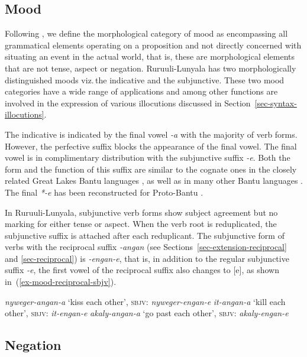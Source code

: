 \subsection{Mood}\label{sec-mood}

Following \citet[1190]{Hengeveld2004Illocution}, we define the morphological category of mood as encompassing all grammatical elements operating on a proposition and not directly concerned with situating an event in the actual world, that is, these are morphological elements that are not tense, aspect or negation. 
Ruruuli-Lunyala has two morphologically distinguished moods viz.\,the indicative and the subjunctive. 
These two  mood categories have a wide range of applications and among other functions are involved in the expression of various illocutions discussed in Section~\ref{sec-syntax-illocutions}.

The indicative is indicated by the final vowel \textit{-a} with the majority of verb forms. However, the perfective suffix blocks the appearance of the final vowel. 
The final vowel is in complimentary distribution with the subjunctive suffix \textit{-e}. 
Both the form and the function of this suffix are similar to the cognate ones in the closely related Great Lakes Bantu languages \citep{Nurseetal1999Tense}, as well as in many other Bantu languages \citep[44, 192]{Nurse2008Tense}. 
The final \textit{*-e} has been reconstructed for Proto-Bantu \citep{Meeussen1967Bantu}. 

In Ru\-ruu\-li\hyp{}Lu\-nya\-la, subjunctive verb forms show subject agreement but no marking for either tense or aspect. 
When the verb root is reduplicated, the subjunctive suffix is attached after each reduplicant. The subjunctive form of verbs with the reciprocal suffix \textit{-angan} (see Sections~\ref{sec-extension-reciprocal} and \ref{sec-reciprocal}) is \textit{-engan-e}, that is, in addition to the regular subjunctive suffix \textit{-e}, the first vowel of the reciprocal suffix also changes to [e], as shown  in~(\ref{ex-mood-reciprocal-sbjv}).

 
\ea
\label{ex-mood-reciprocal-sbjv}
\begin{xlist}
\ex\textit{nyweger-angan-a} `kiss each other', \textsc{sbjv}: \textit{nyweger-engan-e}
\ex\textit{it-angan-a} `kill each other', \textsc{sbjv}: \textit{it-engan-e}
\ex\textit{akaly-angan-a} `go past each other', \textsc{sbjv}: \textit{akaly-engan-e}
\end{xlist}
\z


\subsection{Negation}\label{sec-negation}

